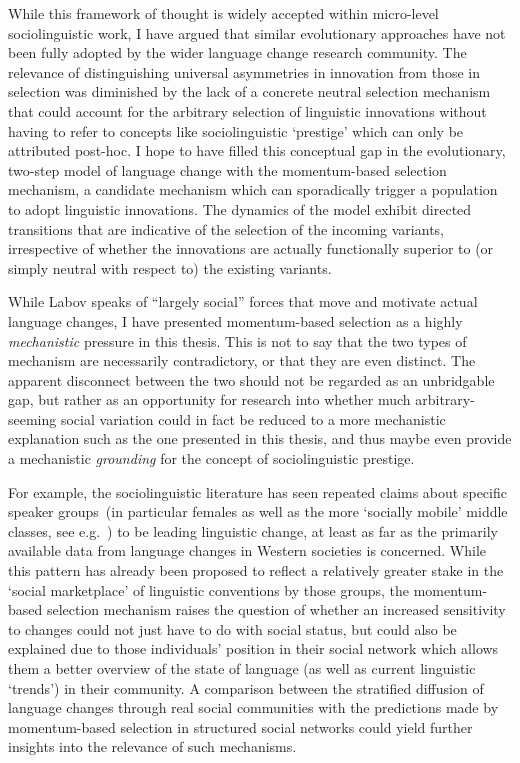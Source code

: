 While this framework of thought is widely accepted within micro-level sociolinguistic work, I have argued that similar evolutionary approaches have not been fully adopted by the wider language change research community. The relevance of distinguishing universal asymmetries in innovation from those in selection was diminished by the lack of a concrete neutral selection mechanism that could account for the arbitrary selection of linguistic innovations without having to refer to concepts like sociolinguistic `prestige' which can only be attributed post-hoc.
I hope to have filled this conceptual gap in the evolutionary, two-step model of language change with the momentum-based selection mechanism, a candidate mechanism which can sporadically trigger a population to adopt linguistic innovations. The dynamics of the model exhibit directed transitions that are indicative of the selection of the incoming variants, irrespective of whether the innovations are actually functionally superior to (or simply neutral with respect to) the existing variants.

While Labov speaks of ``largely social'' forces that move and motivate actual language changes, I have presented momentum-based selection as a highly \emph{mechanistic} pressure in this thesis.
This is not to say that the two types of mechanism are necessarily contradictory, or that they are even distinct.
The apparent disconnect between the two should not be regarded as an unbridgable gap, but rather as an opportunity for research into whether much arbitrary-seeming social variation could in fact be reduced to a more mechanistic explanation such as the one presented in this thesis,
and thus maybe even provide a mechanistic \emph{grounding} for the concept of sociolinguistic prestige.

For example, the sociolinguistic literature has seen repeated claims about specific speaker groups~(in particular females as well as the more `socially mobile' middle classes, see e.g.~\citealt[p.501]{Labov2001}) to be leading linguistic change, at least as far as the primarily available data from language changes in Western societies is concerned. While this pattern has already been proposed to reflect a relatively greater stake in the `social marketplace' of linguistic conventions by those groups, the momentum-based selection mechanism raises the question of whether an increased sensitivity to changes could not just have to do with social status, but could also be explained due to those individuals' position in their social network which allows them a better overview of the state of language (as well as current linguistic `trends') in their community. A comparison between the stratified diffusion of language changes through real social communities with the predictions made by momentum-based selection in structured social networks
could yield further insights into the relevance of such mechanisms.

